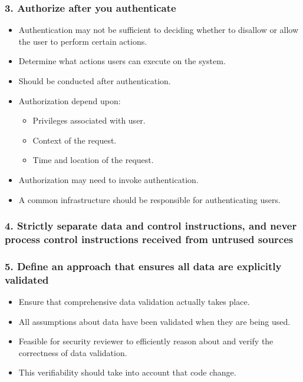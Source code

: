 \documentclass[12pt,norsk]{beamer}
\begin{document}
\begin{frame}

	\frametitle{3. Authorize after you authenticate}

	\begin{itemize}
		\item Authentication may not be sufficient to deciding whether to disallow or allow the user to perform certain actions.
		\item Determine what actions users can execute on the system.
		\item Should be conducted after authentication. 
		\item Authorization depend upon:
		\begin{itemize}
			\item Privileges associated with user.
			\item Context of the request.
			\item Time and location of the request.
		\end{itemize}
		\item Authorization may need to invoke authentication.
		\item A common infrastructure should be responsible for authenticating users.
		
		
	\end{itemize}		

\end{frame}

\begin{frame}

	\frametitle{4. Strictly separate data and control instructions, and never process control instructions received from untrused sources}
	

\end{frame}

\begin{frame}

	\frametitle{5. Define an approach that ensures all data are explicitly validated}
	
	\begin{itemize}
		\item Ensure that comprehensive data validation actually takes place.
		\item All assumptions about data have been validated when they are being used.
		\item Feasible for security reviewer to efficiently reason about and verify the correctness of data validation.
		\item This verifiability should take into account that code change.
	
	\end{itemize}
	

\end{frame}
\end{document}
